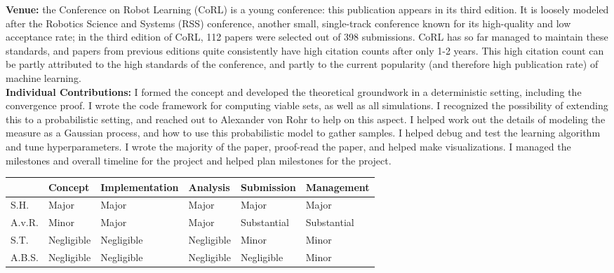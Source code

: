 \textbf{Venue: }
the Conference on Robot Learning (CoRL) is a young conference: this publication appears in its third edition. It is loosely modeled after the Robotics Science and Systems (RSS) conference, another small, single-track conference known for its high-quality and low acceptance rate; in the third edition of CoRL, 112 papers were selected out of 398 submissions. CoRL has so far managed to maintain these standards, and papers from previous editions quite consistently have high citation counts after only 1-2 years. This high citation count can be partly attributed to the high standards of the conference, and partly to the current popularity (and therefore high publication rate) of machine learning. \\
\textbf{Individual Contributions: }
I formed the concept and developed the theoretical groundwork in a deterministic setting, including the convergence proof. I wrote the code framework for computing viable sets, as well as all simulations. I recognized the possibility of extending this to a probabilistic setting, and reached out to Alexander von Rohr to help on this aspect. I helped work out the details of modeling the measure as a Gaussian process, and how to use this probabilistic model to gather samples. I helped debug and test the learning algorithm and tune hyperparameters. I wrote the majority of the paper, proof-read the paper, and helped make visualizations. I managed the milestones and overall timeline for the project and helped plan milestones for the project.
\begin{table}[h!]
\begin{tabular}{l|l|l|l|l|l|}
\cline{2-6}
\textbf{} & \textbf{Concept} & {\footnotesize \textbf{Implementation}} & \textbf{Analysis} & \textbf{Submission} & {\footnotesize \textbf{Management}} \\ \hline
\multicolumn{1}{|l|}{S.H.} & Major & Major & Major & Major & Major \\ \hline
\multicolumn{1}{|l|}{A.v.R.} & Minor & Major & Major & Substantial & Substantial \\ \hline
\multicolumn{1}{|l|}{S.T.} & Negligible & Negligible & Negligible & Minor & Minor \\ \hline
\multicolumn{1}{|l|}{A.B.S.} & Negligible & Negligible & Negligible & Negligible & Minor \\ \hline
\end{tabular}
\end{table}
\\

